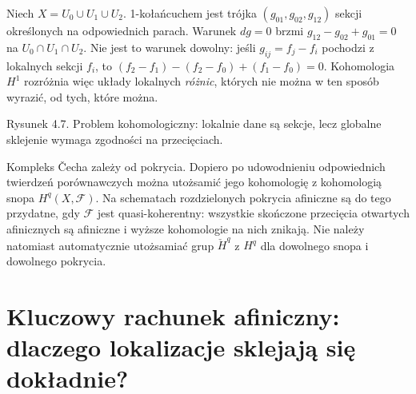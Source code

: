 \begin{przyklad}
Niech $X=U_0\cup U_1\cup U_2$. 1-kołańcuchem jest
trójka $(g_{01},g_{02},g_{12})$ sekcji określonych
na odpowiednich parach. Warunek $dg=0$ brzmi
$g_{12}-g_{02}+g_{01}=0$ na $U_0\cap U_1\cap U_2$.
Nie jest to warunek dowolny: jeśli $g_{ij}=f_j-f_i$
pochodzi z lokalnych sekcji $f_i$, to
$(f_2-f_1)-(f_2-f_0)+(f_1-f_0)=0$.
Kohomologia $H^1$ rozróżnia więc układy lokalnych
\emph{różnic}, których nie można w ten sposób wyrazić,
od tych, które można.
\end{przyklad}

\begin{center}

{\small Rysunek 4.7. Problem kohomologiczny: lokalnie dane są
sekcje, lecz globalne sklejenie wymaga zgodności na przecięciach.}
\end{center}

\begin{uwaga}
Kompleks Čecha zależy od pokrycia. Dopiero po udowodnieniu
odpowiednich twierdzeń porównawczych można utożsamić jego
kohomologię z kohomologią snopa $H^q(X,\mathcal F)$.
Na schematach rozdzielonych pokrycia afiniczne są do tego
przydatne, gdy $\mathcal F$ jest quasi-koherentny:
wszystkie skończone przecięcia otwartych afinicznych są
afiniczne i wyższe kohomologie na nich znikają.
Nie należy natomiast automatycznie utożsamiać grup
$\check H^q$ z $H^q$ dla dowolnego snopa i dowolnego pokrycia.
\end{uwaga}

\section{Kluczowy rachunek afiniczny: dlaczego lokalizacje sklejają się dokładnie?}
\label{sec:affine-cech-proof}


